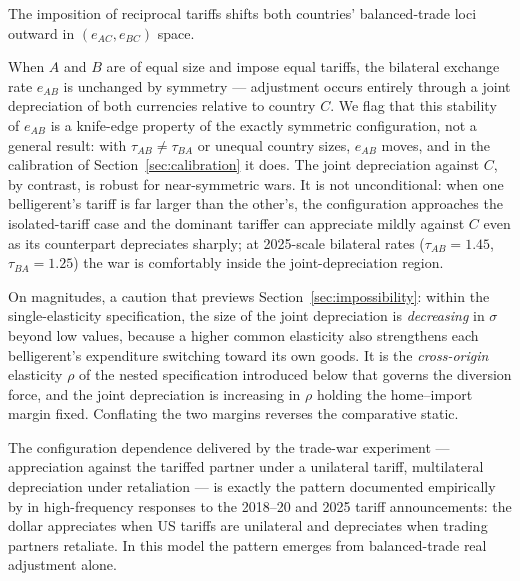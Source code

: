 \documentclass[11pt]{article}
\theoremstyle{plain}
\theoremstyle{remark}
\numberwithin{lemma}{section}
\numberwithin{proposition}{section}
\numberwithin{corollary}{section}
\newcommand{\rev}[1]{{\color{RevBlue}#1}}
\begin{document}
The imposition of reciprocal tariffs shifts both countries' balanced-trade loci outward in $(e_{AC}, e_{BC})$ space. \rev{When $A$ and $B$ are of equal size and impose equal tariffs, the bilateral exchange rate $e_{AB}$ is unchanged by symmetry --- adjustment occurs entirely through a joint depreciation of both currencies relative to country $C$. We flag that this stability of $e_{AB}$ is a knife-edge property of the exactly symmetric configuration, not a general result: with $\tau_{AB} \neq \tau_{BA}$ or unequal country sizes, $e_{AB}$ moves, and in the calibration of Section~\ref{sec:calibration} it does. The joint depreciation against $C$, by contrast, is robust for near-symmetric wars. It is not unconditional: when one belligerent's tariff is far larger than the other's, the configuration approaches the isolated-tariff case and the dominant tariffer can appreciate mildly against $C$ even as its counterpart depreciates sharply; at 2025-scale bilateral rates ($\tau_{AB} = 1.45$, $\tau_{BA} = 1.25$) the war is comfortably inside the joint-depreciation region.

On magnitudes, a caution that previews Section~\ref{sec:impossibility}: within the single-elasticity specification, the size of the joint depreciation is \emph{decreasing} in $\sigma$ beyond low values, because a higher common elasticity also strengthens each belligerent's expenditure switching toward its own goods. It is the \emph{cross-origin} elasticity $\rho$ of the nested specification introduced below that governs the diversion force, and the joint depreciation is increasing in $\rho$ holding the home--import margin fixed. Conflating the two margins reverses the comparative static.

The configuration dependence delivered by the trade-war experiment --- appreciation against the tariffed partner under a unilateral tariff, multilateral depreciation under retaliation --- is exactly the pattern documented empirically by \cite{corsetti2025} in high-frequency responses to the 2018--20 and 2025 tariff announcements: the dollar appreciates when US tariffs are unilateral and depreciates when trading partners retaliate. In this model the pattern emerges from balanced-trade real adjustment alone.}
\end{document}
